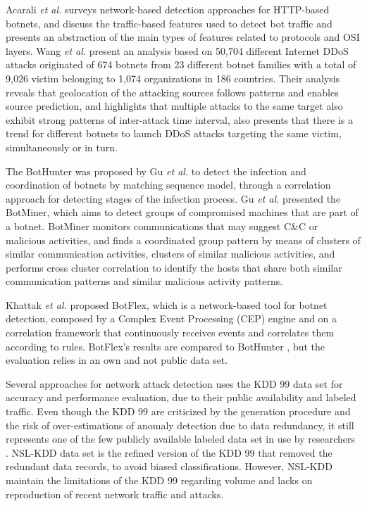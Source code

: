 \documentclass[review]{elsarticle}
\begin{document}
Acarali \emph{et al.} \cite{acarali2016survey} surveys network-based detection approaches for HTTP-based botnets, and discuss the traffic-based features used to detect bot traffic and presents an abstraction of the main types of features related to protocols and OSI layers. Wang \emph{et al.} \cite{Wang2018ddosbotnetssurvey} present an analysis based on 50,704 different Internet DDoS attacks originated of 674 botnets from 23 different botnet families with a total of 9,026 victim belonging to 1,074 organizations in 186 countries. Their analysis reveals that geolocation of the attacking sources follows patterns and enables source prediction, and highlights that multiple attacks to the same target also exhibit strong patterns of inter-attack time interval, also presents that there is a trend for different botnets to launch DDoS attacks targeting the same victim, simultaneously or in turn.

The BotHunter was proposed by Gu \emph{et al.} \cite{gu2007bothunter} to detect the infection and coordination of botnets by matching sequence model, through a correlation approach for detecting stages of the infection process.  Gu \emph{et al.} \cite{gu2008botminer} presented the BotMiner, which aims to detect groups of compromised machines that are part of a botnet. BotMiner monitors communications that may suggest C\&C or malicious activities, and finds a coordinated group pattern by means of clusters of similar communication activities, clusters of similar malicious activities, and performs cross cluster correlation to identify the hosts that share both similar communication patterns and similar malicious activity patterns.

Khattak \emph{et al.} \cite{khattak2015botflex} proposed BotFlex, which is a network-based tool for botnet detection, composed by a Complex Event Processing (CEP) engine and on a correlation framework that continuously receives events and correlates them according to rules. BotFlex's results are compared to BotHunter \cite{gu2007bothunter}, but the evaluation relies in an own and not public data set.

Several approaches for network attack detection uses the KDD 99 \cite{ahmed2016survey,osanaiye2016distributed,bhuyan2014network} data set for accuracy and performance evaluation, due to their public availability and labeled traffic. Even though the KDD 99 are criticized by the generation procedure and the risk of over-estimations of anomaly detection due to data redundancy, it still represents one of the few publicly available labeled data set in use by researchers \cite{osanaiye2016distributed,bhuyan2014network}. NSL-KDD \cite{tavallaee2009detailed} data set is the refined version of the KDD 99 that removed the redundant data records, to avoid biased classifications. However, NSL-KDD maintain the limitations of the KDD 99 regarding volume and lacks on reproduction of recent network traffic and attacks.
\end{document}

